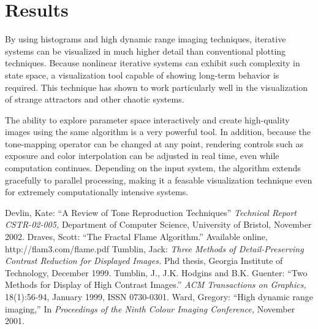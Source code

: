 \documentclass[letterpaper, 12pt]{article}
\begin{document}
\section{Results}
By using histograms and high dynamic range imaging techniques, iterative systems can be
visualized in much higher detail than conventional plotting techniques.  Because
nonlinear iterative systems can exhibit such complexity in state space, a visualization
tool capable of showing long-term behavior is required. This technique has shown to
work particularly well in the visualization of strange attractors and other chaotic
systems.

The ability to explore parameter space interactively and create high-quality images
using the same algorithm is a very powerful tool.  In addition, because the tone-mapping
operator can be changed at any point, rendering controls such as exposure and color
interpolation can be adjusted in real time, even while computation continues. Depending
on the input system, the algorithm extends gracefully to parallel processing, making
it a feasable visualization technique even for extremely computationally intensive
systems.

\begin{thebibliography}{77}
 Devlin, Kate: ``A Review of Tone Reproduction Techniques'' {\it Technical Report CSTR-02-005,} Department of Computer Science, University of Bristol, November 2002.
 Draves, Scott: ``The Fractal Flame Algorithm.'' Available online, http://flam3.com/flame.pdf
 Tumblin, Jack: {\it Three Methods of Detail-Preserving Contrast Reduction for Displayed Images.} Phd thesis, Georgia Institute of Technology, December 1999.
 Tumblin, J., J.K. Hodgins and B.K. Guenter: ``Two Methods for Display of High Contrast Images.'' {\it ACM Transactions on Graphics,} 18(1):56-94, January 1999, ISSN 0730-0301.
 Ward, Gregory: ``High dynamic range imaging,'' In {\it Proceedings of the Ninth Colour Imaging Conference,} November 2001.
\end{thebibliography}
\end{document}

